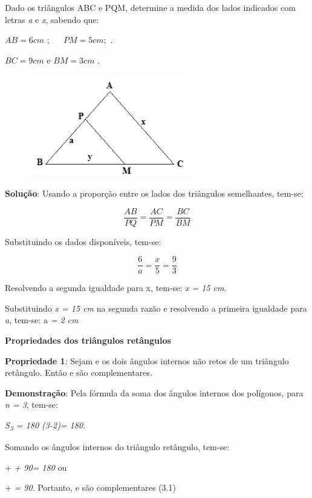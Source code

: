 \begin{texemplo}
\begin{multicols}{2}
Dado os triângulos ABC e PQM, determine a medida dos \tab lados indicados com letras \textit{a} e \textit{x}, \tab sabendo que:

 \( AB=6 cm \) ; \( ~~~~~~  PM=5 cm; \)     .\tab \tab 

 \( BC=9 cm \)    e   \( BM=3 cm \) .

\begin{figure}[H]
    \begin{Center}
        \includegraphics[width=2.75in,height=1.75in]{capitulos/trigonometria_e_funcoes_trigonometricas/media/image11.png}
    \end{Center}
\end{figure}

\end{multicols}
\textbf{Solução}: Usando a proporção entre os lados dos triângulos semelhantes, tem-se:

 \[ \frac{AB}{PQ}=\frac{AC}{PM}=\frac{BC}{BM} \]

Substituindo os dados disponíveis, tem-se:

 \[ \frac{6}{a}=\frac{x}{5}=\frac{9}{3} \]

Resolvendo a segunda igualdade para x, tem-se:  \textit{x = 15 cm}.

Substituindo \textit{x = 15 cm}  na segunda razão e resolvendo a primeira igualdade para \textit{a}, tem-se: a\textit{ = 2 cm} \textit{\qedsymbol}
\end{texemplo}

\textbf{Propriedades dos triângulos retângulos}

\begin{caixa}
\textbf{Propriedade 1}: Sejam e  os dois ângulos internos não retos de um triângulo retângulo. Então  e  são complementares.

\textbf{Demonstração}: Pela fórmula da soma dos ângulos internos dos polígonos, para \textit{n = 3}, tem-se:

\textit{S\textsubscript{3} = 180 (3-2)= 180\degree .}

Somando os ângulos internos do triângulo retângulo, tem-se:

 +  \textit{+ 90\degree = 180\degree}  ou

 +  \textit{= 90\degree}. Portanto,  e  são complementares \qedsymbol \tab (3.1)
\end{caixa}

